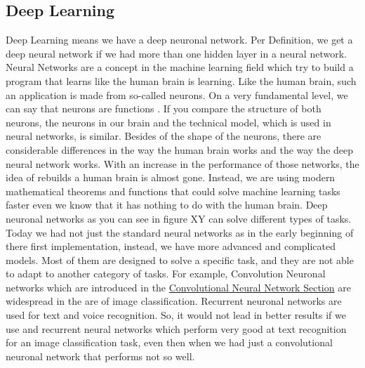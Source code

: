 \documentclass[journal]{IEEEtran}
\begin{document}
\subsection{Deep Learning}
\label{subsec:deeplearning}
Deep Learning means we have a deep neuronal network. Per Definition, we get a deep neural network if we had more than one hidden layer in a neural network. Neural Networks are a concept in the machine learning field which try to build a program that learns like the human brain is learning. Like the human brain, such an application is made from so-called neurons. On a very fundamental level, we can say that neurons are functions \cite{RN5}. If you compare the structure of both neurons, the neurons in our brain and the technical model, which is used in neural networks, is similar. Besides of the shape of the neurons, there are considerable differences in the way the human brain works and the way the deep neural network works. With an increase in the performance of those networks, the idea of rebuilds a human brain is almost gone. Instead, we are using modern mathematical theorems and functions that could solve machine learning tasks faster even we know that it has nothing to do with the human brain.
Deep neuronal networks as you can see in figure XY can solve different types of tasks. Today we had not just the standard neural networks as in the early beginning of there first implementation, instead, we have more advanced and complicated models. Most of them are designed to solve a specific task, and they are not able to adapt to another category of tasks. For example, Convolution Neuronal networks which are introduced in the \hyperref[subsec:cnn]{Convolutional Neural Network Section} are widespread in the are of image classification. Recurrent neuronal networks are used for text and voice recognition. So, it would not lead in better results if we use and recurrent neural networks which perform very good at text recognition for an image classification task, even then when we had just a  convolutional neuronal network that performs not so well.
\end{document}
